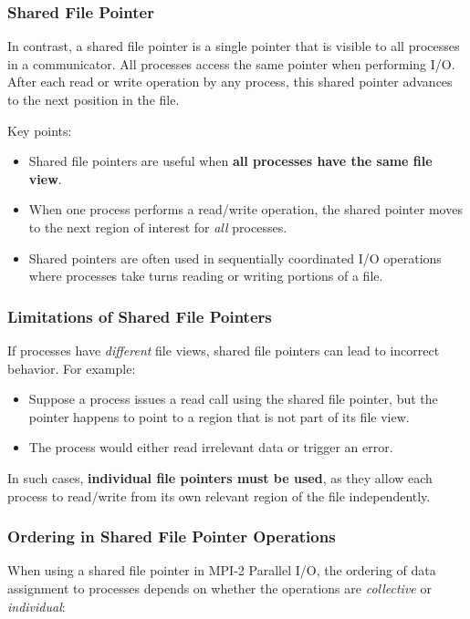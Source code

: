 \documentclass[12pt]{book}
\begin{document}
\subsubsection*{Shared File Pointer}
In contrast, a shared file pointer is a single pointer that is visible to all processes in a communicator. All processes access the same pointer when performing I/O. After each read or write operation by any process, this shared pointer advances to the next position in the file. 

Key points:
\begin{itemize}
    \item Shared file pointers are useful when \textbf{all processes have the same file view}.
    \item When one process performs a read/write operation, the shared pointer moves to the next region of interest for \emph{all} processes.
    \item Shared pointers are often used in sequentially coordinated I/O operations where processes take turns reading or writing portions of a file.
\end{itemize}

\subsubsection*{Limitations of Shared File Pointers}
If processes have \emph{different} file views, shared file pointers can lead to incorrect behavior. For example:
\begin{itemize}
    \item Suppose a process issues a read call using the shared file pointer, but the pointer happens to point to a region that is not part of its file view.
    \item The process would either read irrelevant data or trigger an error.
\end{itemize}

In such cases, \textbf{individual file pointers must be used}, as they allow each process to read/write from its own relevant region of the file independently.

\subsubsection*{Ordering in Shared File Pointer Operations}

When using a shared file pointer in MPI-2 Parallel I/O, the ordering of data assignment to processes depends on whether the operations are \emph{collective} or \emph{individual}:
\end{document}

